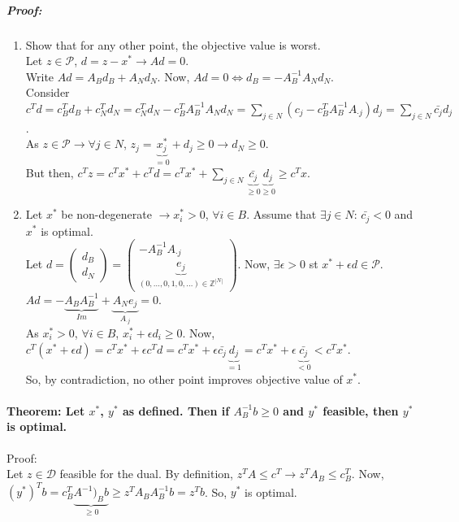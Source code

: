 \documentclass[main]{subfiles}
\begin{document}
\subparagraph{Proof:}
\begin{enumerate}
\item Show that for any other point, the objective value is worst.\\
Let $z \in \mathcal{P}$, $d = z -x^* \rightarrow Ad = 0$.\\
Write $Ad = A_B d_B + A_N d_N$. Now, $Ad = 0 \iff d_B = -A^{-1}_B A_N d_N$.\\
Consider $c^T d = c^T_B d_B + c^T_N d_N = c^T_N d_N - c^T_B A^{-1}_B A_N d_N =
\sum_{j \in N} (c_j - c^T_B A^{-1}_B A_{\cdot j})d_j = \sum_{j \in N}
\bar{c_j}d_j$.\\
As $z \in \mathcal{P} \rightarrow \forall j \in N$, $z_j =
\underbrace{x^*_j}_{=0} + d_j \geq 0 \rightarrow d_N \geq 0$.\\
But then, $c^T z = c^T x^* + c^T d = c^T x^* +
\sum_{j \in N} \underbrace{\bar{c_j}}_{\geq 0} \underbrace{d_j}_{\geq 0}
\geq c^T x$.

\item Let $x^*$ be non-degenerate $\rightarrow x^*_i > 0$, $\forall i \in B$.
Assume that $\exists j \in N$: $\bar{c_j} < 0$ and $x^*$ is optimal.\\
Let $d =
\begin{pmatrix}
d_B\\
d_N
\end{pmatrix}
=
\begin{pmatrix}
-A^{-1}_B A_{\cdot j}\\
\underbrace{e_j}_{(0,\dots, 0, 1, 0, \dots) \in \mathbb{Z}^{|N|}}
\end{pmatrix}$.
Now, $\exists \epsilon > 0$ st $x^* + \epsilon d \in \mathcal{P}$.\\
$Ad = -\underbrace{A_B A^{-1}_B}_{Im} + \underbrace{A_N e_j}_{A_{\cdot j}} =
0$.\\
As $x^*_i > 0$, $\forall i \in B$, $x^*_i + \epsilon d_i \geq 0$.
Now, $c^T(x^* + \epsilon d) = c^T x^* + \epsilon c^T d = c^T x^* + \epsilon
\bar{c_j} \underbrace{d_j}_{=1} = c^T x^* + \epsilon
\underbrace{\bar{c_j}}_{< 0} < c^T x^*$.\\
So, by contradiction, no other point improves objective value of $x^*$.
\end{enumerate}

\paragraph{Theorem: Let $x^*$, $y^*$ as defined. Then if $A^{-1}_B b \geq 0$
and $y^*$ feasible, then $y^*$ is optimal.}

Proof:\\
Let $z \in \mathcal{D}$ feasible for the dual.
By definition, $z^T A \leq c^T \rightarrow z^T A_B \leq c^T_B$.
Now, $(y^*)^T b = c^T_B \underbrace{A^{-1})_B b}_{\geq 0}
\geq z^T A_B A^{-1}_B b = z^T b$. So, $y^*$ is optimal.
\end{document}
